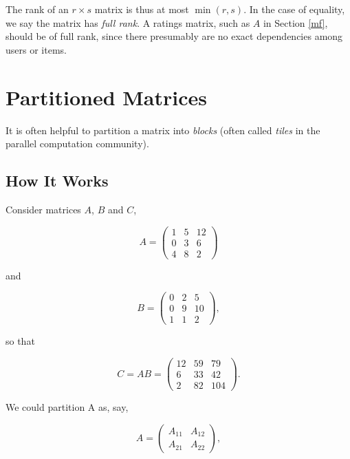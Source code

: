 The rank of an $r \times s$ matrix is thus at most $\min(r,s)$.  In
the case of equality, we say the matrix has \textit{full rank}.  A
ratings matrix, such as $A$ in Section \ref{mf}, should be of full rank,
since there presumably are no exact dependencies among users or items.

\section{Partitioned Matrices}
\label{partmat}

It is often helpful to partition a matrix into \textit{blocks} (often
called {\it tiles} in the parallel computation community).

\subsection{How It Works}

Consider matrices $A$, $B$ and $C$,

\begin{equation}
A = 
\left (
\begin{array}{ccc}
1 & 5 & 12 \\
0 & 3 & 6 \\
4 & 8 & 2
\end{array}
\right )
\end{equation}

and

\begin{equation}
B = 
\left (
\begin{array}{ccc}
0 & 2 & 5 \\
0 & 9 & 10 \\
1 & 1 & 2
\end{array}
\right ), 
\end{equation}

so that

\begin{equation}
C = AB = 
\left (
\begin{array}{ccc}
12 & 59 & 79 \\
6 & 33 & 42 \\
2 & 82 & 104
\end{array}
\right ) .
\end{equation}

We could partition A as, say,

\begin{equation}
A =
\left (
\begin{array}{cc}
A_{11} & A_{12} \\
A_{21} & A_{22}
\end{array}
\right ) ,
\end{equation}


